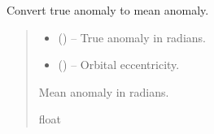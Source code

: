 \documentclass[letterpaper,10pt,english]{sphinxmanual}
\begin{document}
\begin{fulllineitems}
\label{\detokenize{fspsim.utils:fspsim.utils.Conversions.true_to_mean_anomaly}}
\pysigstartsignatures
{}
\pysigstopsignatures
\sphinxAtStartPar
Convert true anomaly to mean anomaly.
\begin{quote}\begin{description}
\begin{itemize}
\item {} 
\sphinxAtStartPar
{} () – True anomaly in radians.

\item {} 
\sphinxAtStartPar
{} () – Orbital eccentricity.

\end{itemize}

\sphinxAtStartPar
Mean anomaly in radians.

\sphinxAtStartPar
float

\end{description}\end{quote}

\end{fulllineitems}

\end{document}
